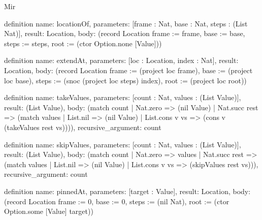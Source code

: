 \begin{lexlean}{Mir}
\begin{semanticmodule}
definition{
  name: locationOf,
  parameters: [frame : Nat, base : Nat, steps : (List Nat)],
  result: Location,
  body: (record Location {frame := frame, base := base, steps := steps, root := (ctor Option.none [Value])})
}

definition{
  name: extendAt,
  parameters: [loc : Location, index : Nat],
  result: Location,
  body: (record Location {frame := (project loc frame), base := (project loc base), steps := (snoc (project loc steps) index), root := (project loc root)})
}

definition{
  name: takeValues,
  parameters: [count : Nat, values : (List Value)],
  result: (List Value),
  body: (match count
    | Nat.zero => (nil Value)
    | Nat.succ rest => (match values
      | List.nil => (nil Value)
      | List.cons v vs => (cons v (takeValues rest vs)))),
  recursive_argument: count
}

definition{
  name: skipValues,
  parameters: [count : Nat, values : (List Value)],
  result: (List Value),
  body: (match count
    | Nat.zero => values
    | Nat.succ rest => (match values
      | List.nil => (nil Value)
      | List.cons v vs => (skipValues rest vs))),
  recursive_argument: count
}

definition{
  name: pinnedAt,
  parameters: [target : Value],
  result: Location,
  body: (record Location {frame := 0, base := 0, steps := (nil Nat), root := (ctor Option.some [Value] target)})
}


\end{semanticmodule}
\end{lexlean}

